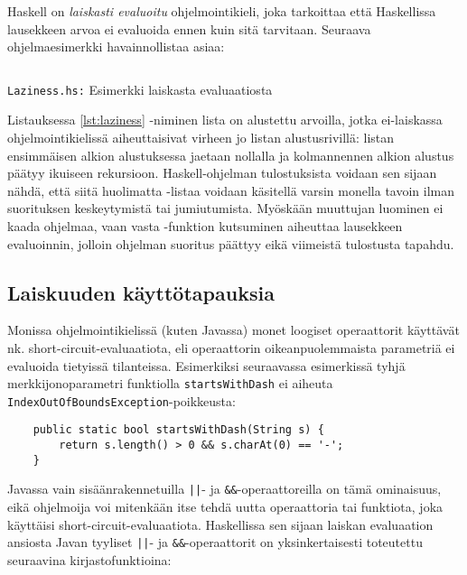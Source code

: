 Haskell on \emph{laiskasti evaluoitu} ohjelmointikieli,
joka tarkoittaa että Haskellissa lausekkeen arvoa ei evaluoida ennen kuin sitä tarvitaan.
Seuraava ohjelmaesimerkki havainnollistaa asiaa:

\begin{listing}[H]
    \inputminted{haskell}{codes/Laziness.hs}
    \label{lst:laziness}
    \caption{\texttt{Laziness.hs:} Esimerkki laiskasta evaluaatiosta}
\end{listing}

Listauksessa \ref{lst:laziness} -niminen lista on alustettu arvoilla,
jotka ei-laiskassa ohjelmointikielissä aiheuttaisivat virheen jo listan alustusrivillä:
listan ensimmäisen alkion alustuksessa jaetaan nollalla ja kolmannennen alkion
alustus päätyy ikuiseen rekursioon.
Haskell-ohjelman tulostuksista voidaan sen sijaan nähdä,
että siitä huolimatta -listaa voidaan käsitellä varsin monella
tavoin ilman suorituksen keskeytymistä tai jumiutumista.
Myöskään muuttujan  luominen ei kaada ohjelmaa,
vaan vasta -funktion kutsuminen aiheuttaa lausekkeen
 evaluoinnin, jolloin ohjelman suoritus päättyy
eikä viimeistä tulostusta tapahdu.

\subsection{Laiskuuden käyttötapauksia}

Monissa ohjelmointikielissä (kuten Javassa) monet loogiset operaattorit käyttävät nk. short-circuit-evaluaatiota,
eli operaattorin oikeanpuolemmaista parametriä ei evaluoida tietyissä tilanteissa.
Esimerkiksi seuraavassa esimerkissä tyhjä merkkijonoparametri funktiolla \texttt{startsWithDash} ei
aiheuta \texttt{IndexOutOfBoundsException}-poikkeusta:

\begin{verbatim}
    public static bool startsWithDash(String s) {
        return s.length() > 0 && s.charAt(0) == '-';
    }
\end{verbatim}

Javassa vain sisäänrakennetuilla \texttt{||}- ja \texttt{\&\&}-operaattoreilla on tämä ominaisuus,
eikä ohjelmoija voi mitenkään itse tehdä uutta operaattoria tai funktiota,
joka käyttäisi short-circuit-evaluaatiota.
Haskellissa sen sijaan laiskan evaluaation ansiosta Javan tyyliset \texttt{||}- ja \texttt{\&\&}-operaattorit on
yksinkertaisesti toteutettu seuraavina kirjastofunktioina:

